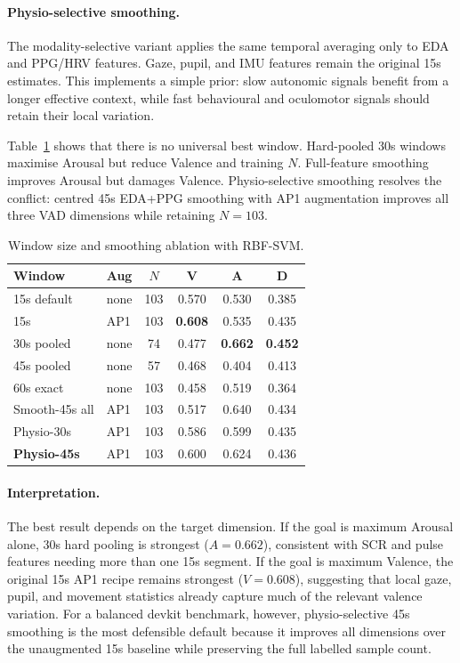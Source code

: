 \documentclass[sigconf,review,anonymous]{acmart}
\newcommand{\best}[1]{\textbf{\textcolor{bestcol}{#1}}}
\begin{document}
\paragraph{Physio-selective smoothing.}
The modality-selective variant applies the same temporal averaging only to EDA
and PPG/HRV features.
Gaze, pupil, and IMU features remain the original 15s estimates.
This implements a simple prior: slow autonomic signals benefit from a longer
effective context, while fast behavioural and oculomotor signals should retain
their local variation.

Table~\ref{tab:window} shows that there is no universal best window.
Hard-pooled 30s windows maximise Arousal but reduce Valence and training $N$.
Full-feature smoothing improves Arousal but damages Valence.
Physio-selective smoothing resolves the conflict: centred 45s EDA+PPG
smoothing with AP1 augmentation improves all three VAD dimensions while
retaining $N=103$.

\begin{table}[t]
\caption{Window size and smoothing ablation with RBF-SVM.}
\label{tab:window}
\centering
\setlength{\tabcolsep}{3.5pt}
\small
\begin{tabular}{llcccc}
\toprule
\textbf{Window} & \textbf{Aug} & \textbf{$N$} & \textbf{V} & \textbf{A} & \textbf{D} \\
\midrule
15s default       & none & 103 & 0.570 & 0.530 & 0.385 \\
15s               & AP1  & 103 & \best{0.608} & 0.535 & 0.435 \\
30s pooled        & none & 74  & 0.477 & \best{0.662} & \best{0.452} \\
45s pooled        & none & 57  & 0.468 & 0.404 & 0.413 \\
60s exact         & none & 103 & 0.458 & 0.519 & 0.364 \\
\midrule
Smooth-45s all    & AP1  & 103 & 0.517 & 0.640 & 0.434 \\
Physio-30s        & AP1  & 103 & 0.586 & 0.599 & 0.435 \\
\best{Physio-45s} & AP1  & 103 & 0.600 & 0.624 & 0.436 \\
\bottomrule
\end{tabular}
\end{table}

\paragraph{Interpretation.}
The best result depends on the target dimension.
If the goal is maximum Arousal alone, 30s hard pooling is strongest
($A=0.662$), consistent with SCR and pulse features needing more than one 15s
segment.
If the goal is maximum Valence, the original 15s AP1 recipe remains strongest
($V=0.608$), suggesting that local gaze, pupil, and movement statistics already
capture much of the relevant valence variation.
For a balanced devkit benchmark, however, physio-selective 45s smoothing is the
most defensible default because it improves all dimensions over the unaugmented
15s baseline while preserving the full labelled sample count.
\end{document}
